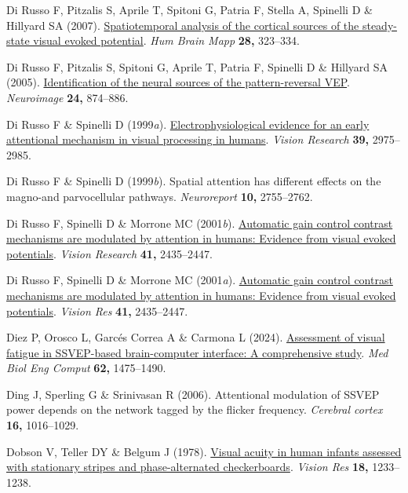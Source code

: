 \documentclass[
  letterpaper,
  DIV=11,
  numbers=noendperiod]{scrartcl}
\newlength{\cslhangindent}
\newenvironment{CSLReferences}[2] %
 {\begin{list}{}{%
  \setlength{\itemindent}{0pt}
  \setlength{\leftmargin}{0pt}
  \setlength{\parsep}{0pt}
  \ifodd #1
   \setlength{\leftmargin}{\cslhangindent}
   \setlength{\itemindent}{-1\cslhangindent}
  \fi
  \setlength{\itemsep}{#2\baselineskip}}}
 {\end{list}}
\begin{document}
\begin{CSLReferences}{1}{1}
Di Russo F, Pitzalis S, Aprile T, Spitoni G, Patria F, Stella A,
Spinelli D \& Hillyard SA (2007).
\href{https://doi.org/10.1002/hbm.20276}{Spatiotemporal analysis of the
cortical sources of the steady-state visual evoked potential}. \emph{Hum
Brain Mapp} \textbf{28,} 323--334.

Di Russo F, Pitzalis S, Spitoni G, Aprile T, Patria F, Spinelli D \&
Hillyard SA (2005).
\href{https://doi.org/10.1016/j.neuroimage.2004.09.029}{Identification
of the neural sources of the pattern-reversal VEP}. \emph{Neuroimage}
\textbf{24,} 874--886.

Di Russo F \& Spinelli D (1999\emph{a}).
\href{https://doi.org/10.1016/S0042-6989(99)00031-0}{Electrophysiological
evidence for an early attentional mechanism in visual processing in
humans}. \emph{Vision Research} \textbf{39,} 2975--2985.

Di Russo F \& Spinelli D (1999\emph{b}). Spatial attention has different
effects on the magno-and parvocellular pathways. \emph{Neuroreport}
\textbf{10,} 2755--2762.

Di Russo F, Spinelli D \& Morrone MC (2001\emph{b}).
\href{https://doi.org/10.1016/S0042-6989(01)00134-1}{Automatic gain
control contrast mechanisms are modulated by attention in humans:
Evidence from visual evoked potentials}. \emph{Vision Research}
\textbf{41,} 2435--2447.

Di Russo F, Spinelli D \& Morrone MC (2001\emph{a}).
\href{https://doi.org/10.1016/s0042-6989(01)00134-1}{Automatic gain
control contrast mechanisms are modulated by attention in humans:
Evidence from visual evoked potentials}. \emph{Vision Res} \textbf{41,}
2435--2447.

Diez P, Orosco L, Garcés Correa A \& Carmona L (2024).
\href{https://doi.org/10.1007/s11517-023-03000-z}{Assessment of visual
fatigue in SSVEP-based brain-computer interface: A comprehensive study}.
\emph{Med Biol Eng Comput} \textbf{62,} 1475--1490.

Ding J, Sperling G \& Srinivasan R (2006). Attentional modulation of
{SSVEP} power depends on the network tagged by the flicker frequency.
\emph{Cerebral cortex} \textbf{16,} 1016--1029.

Dobson V, Teller DY \& Belgum J (1978).
\href{https://doi.org/10.1016/0042-6989(78)90109-8}{Visual acuity in
human infants assessed with stationary stripes and phase-alternated
checkerboards}. \emph{Vision Res} \textbf{18,} 1233--1238.


\end{CSLReferences}
\end{document}
